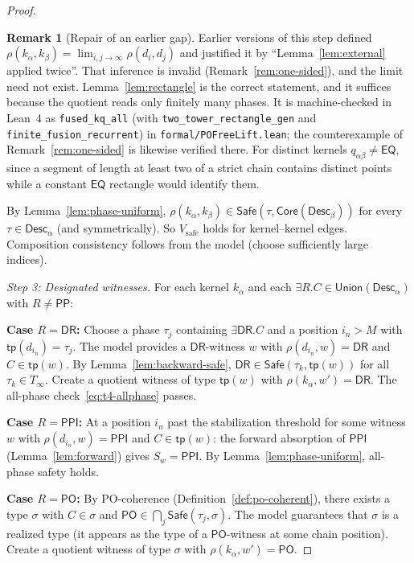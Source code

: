 \documentclass[a4paper,11pt]{article}
\theoremstyle{definition}
\newtheorem{remark}[theorem]{Remark}
\newcommand{\DR}{\ensuremath{\mathsf{DR}}}
\newcommand{\PO}{\ensuremath{\mathsf{PO}}}
\newcommand{\EQ}{\ensuremath{\mathsf{EQ}}}
\newcommand{\PP}{\ensuremath{\mathsf{PP}}}
\newcommand{\PPI}{\ensuremath{\mathsf{PPI}}}
\newcommand{\tp}{\ensuremath{\mathsf{tp}}}
\newcommand{\Desc}{\ensuremath{\mathsf{Desc}}}
\newcommand{\Core}{\ensuremath{\mathsf{Core}}}
\newcommand{\Union}{\ensuremath{\mathsf{Union}}}
\newcommand{\Safe}{\ensuremath{\mathsf{Safe}}}
\begin{document}
\begin{proof}
\begin{remark}[Repair of an earlier gap]\label{rem:step2-repair}
Earlier versions of this step defined
$\rho(k_\alpha,k_\beta) = \lim_{i,j\to\infty}\rho(d_i,d_j)$ and
justified it by ``Lemma~\ref{lem:external} applied twice''.  That
inference is invalid (Remark~\ref{rem:one-sided}), and the limit need
not exist.  Lemma~\ref{lem:rectangle} is the correct statement, and it
suffices because the quotient reads only finitely many phases.  It is
machine-checked in Lean~4 as \texttt{fused\_kq\_all} (with
\texttt{two\_tower\_rectangle\_gen} and
\texttt{finite\_fusion\_recurrent}) in
\texttt{formal/POFreeLift.lean}; the counterexample of
Remark~\ref{rem:one-sided} is likewise verified there.  For distinct
kernels $q_{\alpha\beta} \ne \EQ$, since a segment of length at least
two of a strict chain contains distinct points while a constant $\EQ$
rectangle would identify them.
\end{remark}

By Lemma~\ref{lem:phase-uniform},
$\rho(k_\alpha, k_\beta) \in \Safe(\tau, \Core(\Desc_\beta))$ for
every $\tau \in \Desc_\alpha$ (and symmetrically).  So
$V_{\mathrm{safe}}$ holds for kernel--kernel edges.  Composition
consistency follows from the model (choose sufficiently large
indices).

\medskip\noindent\textit{Step 3: Designated witnesses.}\;
For each kernel $k_\alpha$ and each
$\exists R.C \in \Union(\Desc_\alpha)$ with $R \ne \PP$:

\textbf{Case $R = \DR$:}\; Choose a phase $\tau_j$ containing
$\exists\DR.C$ and a position $i_n > M$ with $\tp(d_{i_n}) = \tau_j$.
The model provides a $\DR$-witness $w$ with $\rho(d_{i_n}, w) = \DR$
and $C \in \tp(w)$.  By Lemma~\ref{lem:backward-safe},
$\DR \in \Safe(\tau_k, \tp(w))$ for all $\tau_k \in T_\infty$.
Create a quotient witness of type $\tp(w)$ with
$\rho(k_\alpha, w') = \DR$.  The all-phase check~\eqref{eq:t4-allphase}
passes.

\textbf{Case $R = \PPI$:}\; At a position $i_n$ past the
stabilization threshold for some witness $w$ with
$\rho(d_{i_n}, w) = \PPI$ and $C \in \tp(w)$: the forward
absorption of $\PPI$ (Lemma~\ref{lem:forward}) gives $S_w = \PPI$.
By Lemma~\ref{lem:phase-uniform}, all-phase safety holds.

\textbf{Case $R = \PO$:}\; By PO-coherence
(Definition~\ref{def:po-coherent}), there exists a type $\sigma$ with
$C \in \sigma$ and $\PO \in \bigcap_j \Safe(\tau_j, \sigma)$.
The model guarantees that $\sigma$ is a realized type (it appears as
the type of a $\PO$-witness at some chain position).  Create a
quotient witness of type $\sigma$ with $\rho(k_\alpha, w') = \PO$.


\end{proof}
\end{document}
